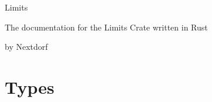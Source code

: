 \documentclass[12pt]{article}
\begin{document}
\centerline{\sc \Huge Limits}
\centerline{\sc \normalsize The documentation for the Limits Crate written in Rust}
\vspace{.5pc}
\vspace{.5pc}
\centerline{\sc \large by Nextdorf}
\vspace{2pc}

\tableofcontents

\section{Types}

%
	
\end{document}
